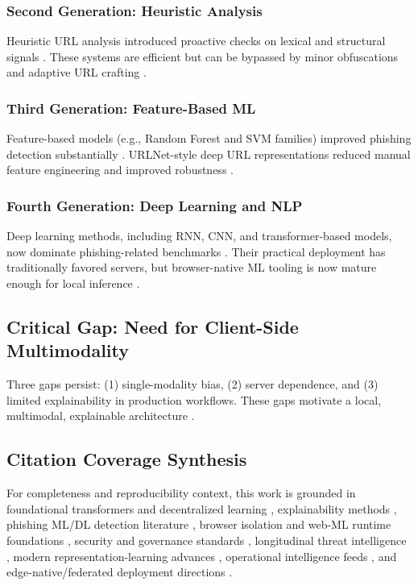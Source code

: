 \documentclass[conference]{IEEEtran}
\begin{document}
\subsubsection{Second Generation: Heuristic Analysis}
Heuristic URL analysis introduced proactive checks on lexical and structural signals \cite{b6,b11,b12}. These systems are efficient but can be bypassed by minor obfuscations and adaptive URL crafting \cite{b17}.

\subsubsection{Third Generation: Feature-Based ML}
Feature-based models (e.g., Random Forest and SVM families) improved phishing detection substantially \cite{b12}. URLNet-style deep URL representations reduced manual feature engineering and improved robustness \cite{b8}.

\subsubsection{Fourth Generation: Deep Learning and NLP}
Deep learning methods, including RNN, CNN, and transformer-based models, now dominate phishing-related benchmarks \cite{b5,b9,b10,b13,b14}. Their practical deployment has traditionally favored servers, but browser-native ML tooling is now mature enough for local inference \cite{b16,b39,b40,b41}.

\subsection{Critical Gap: Need for Client-Side Multimodality}
Three gaps persist: (1) single-modality bias, (2) server dependence, and (3) limited explainability in production workflows. These gaps motivate a local, multimodal, explainable architecture \cite{b3,b4,b7,b26,b32,b45}.

\subsection{Citation Coverage Synthesis}
For completeness and reproducibility context, this work is grounded in foundational transformers and decentralized learning \cite{b1,b2}, explainability methods \cite{b3,b4}, phishing ML/DL detection literature \cite{b5,b6,b8,b9,b10,b11,b12,b13,b14,b17}, browser isolation and web-ML runtime foundations \cite{b15,b16,b39,b40,b41}, security and governance standards \cite{b18,b25,b26,b28,b31,b32,b45}, longitudinal threat intelligence \cite{b19,b20,b21,b29,b30,b33,b34,b35,b37,b42,b43,b44,b51,b52}, modern representation-learning advances \cite{b22,b23,b24,b27,b36,b50}, operational intelligence feeds \cite{b46,b47,b48,b49}, and edge-native/federated deployment directions \cite{b53,b54,b55}.
\end{document}
